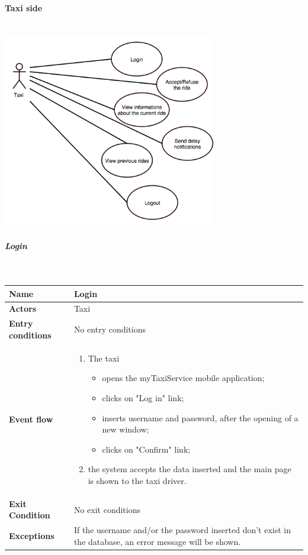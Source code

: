 \paragraph{Taxi side}
	\begin{center}
	~\\
\includegraphics[width=0.70\textwidth]{./images/UseCaseTaxi.png}~
	\end{center}

\subparagraph{Login}
~\\[0.2cm]
\vspace{20pt}
\noindent
\begin{tabular}{l l}
 \textbf {Name} & Login  \\ \hline
 \textbf{Actors} & Taxi \\ \hline
 \textbf{Entry conditions} & No entry conditions \\ \hline
 \textbf{Event flow} & 
 \parbox{0.7\textwidth}{
 \begin{enumerate}
 \item The taxi
    \begin{itemize}
    \item opens the myTaxiService mobile application;
    \item clicks on "Log in" link;
    \item inserts username and password, after the opening of a new window;
    \item clicks on "Confirm" link;
    \end{itemize}
 \item the system accepts the data inserted and the main page is shown to the taxi driver.
 \end{enumerate}
 } \\ \hline
 \textbf{Exit Condition} & No exit conditions \\ \hline
 \textbf{Exceptions} & \parbox{0.7\textwidth}{If the username and/or the password inserted don't exist in the database, an error message will be shown.}
\end{tabular}

